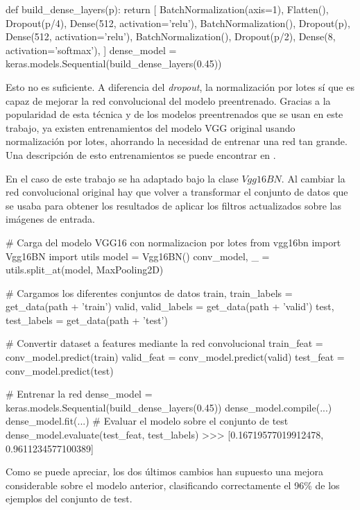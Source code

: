 \begin{python}
def build_dense_layers(p):
    return [
        BatchNormalization(axis=1),
        Flatten(),
        Dropout(p/4),
        Dense(512, activation='relu'),
        BatchNormalization(),
        Dropout(p),
        Dense(512, activation='relu'),
        BatchNormalization(),
        Dropout(p/2),
        Dense(8, activation='softmax'),
    ]
dense_model = keras.models.Sequential(build_dense_layers(0.45))
\end{python}

Esto no es suficiente. A diferencia del \textit{dropout}, la normalización por lotes sí que es capaz de mejorar la red convolucional del modelo preentrenado. Gracias a la popularidad de esta técnica y de los modelos preentrenados que se usan en este trabajo, ya existen entrenamientos del modelo VGG original usando normalización por lotes, ahorrando la necesidad de entrenar una red tan grande. Una descripción de esto entrenamientos se puede encontrar en \parencite{pretrained_with_bn}.

En el caso de este trabajo se ha adaptado bajo la clase $Vgg16BN$. Al cambiar la red convolucional original hay que volver a transformar el conjunto de datos que se usaba para obtener los resultados de aplicar los filtros actualizados sobre las imágenes de entrada.

\begin{python}
# Carga del modelo VGG16 con normalizacion por lotes
from vgg16bn import Vgg16BN
import utils
model = Vgg16BN()
conv_model, _ = utils.split_at(model, MaxPooling2D)

# Cargamos los diferentes conjuntos de datos
train, train_labels = get_data(path + 'train')
valid, valid_labels = get_data(path + 'valid')
test, test_labels = get_data(path + 'test')

# Convertir dataset a features mediante la red convolucional
train_feat = conv_model.predict(train)
valid_feat = conv_model.predict(valid)
test_feat = conv_model.predict(test)

# Entrenar la red
dense_model = keras.models.Sequential(build_dense_layers(0.45))
dense_model.compile(...)
dense_model.fit(...)
# Evaluar el modelo sobre el conjunto de test
dense_model.evaluate(test_feat, test_labels)
>>> [0.16719577019912478, 0.9611234577100389]
\end{python}

Como se puede apreciar, los dos últimos cambios han supuesto una mejora considerable sobre el modelo anterior, clasificando correctamente el 96\% de los ejemplos del conjunto de test.

